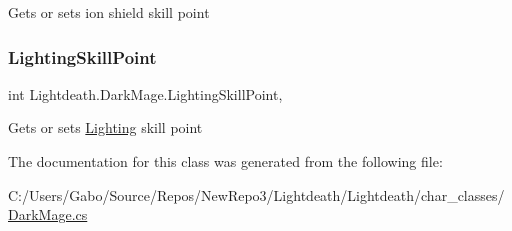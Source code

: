 Gets or sets ion shield skill point 

\hypertarget{class_lightdeath_1_1_dark_mage_a73295fab5ee78af8a6d0e5b5976bd4f7}{}\label{class_lightdeath_1_1_dark_mage_a73295fab5ee78af8a6d0e5b5976bd4f7} 
\subsubsection{\texorpdfstring{Lighting\+Skill\+Point}{LightingSkillPoint}}
{\footnotesize\ttfamily int Lightdeath.\+Dark\+Mage.\+Lighting\+Skill\+Point\hspace{0.3cm}{\ttfamily [get]}, {\ttfamily [set]}}



Gets or sets \hyperlink{class_lightdeath_1_1_lighting}{Lighting} skill point 



The documentation for this class was generated from the following file\+:\begin{DoxyCompactItemize}
\item 
C\+:/\+Users/\+Gabo/\+Source/\+Repos/\+New\+Repo3/\+Lightdeath/\+Lightdeath/char\+\_\+classes/\hyperlink{_dark_mage_8cs}{Dark\+Mage.\+cs}\end{DoxyCompactItemize}
